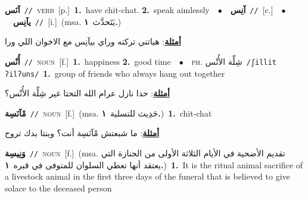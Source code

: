 \documentclass[10pt,a4paper,twoside]{article} %
\begin{document}
\begin{multicols}{2}
{\setlength\topsep{0pt}\textbf{\foreignlanguage{arabic}{آنَس}}\ {\color{gray}\texttt{//}\color{black}}\ \textsc{verb}\ [p.]\ \textbf{1.}~have chit-chat.  \textbf{2.}~speak aimlessly\ \ $\bullet$\ \ \setlength\topsep{0pt}\textbf{\foreignlanguage{arabic}{آنِس}}\ {\color{gray}\texttt{//}\color{black}}\ [c.]\ \ $\bullet$\ \ \setlength\topsep{0pt}\textbf{\foreignlanguage{arabic}{يآنِس}}\ {\color{gray}\texttt{//}\color{black}}\ [i.]\ \color{gray}(msa. \foreignlanguage{arabic}{يَتَحدَّث}~\foreignlanguage{arabic}{\textbf{١.}})\color{black}\  \begin{flushright}\color{gray}\foreignlanguage{arabic}{\textbf{\underline{\foreignlanguage{arabic}{أمثلة}}}: هياتني تركته وراي بيآنِس مع الاخوان اللي ورا}\end{flushright}\color{black}} \vspace{2mm}

{\setlength\topsep{0pt}\textbf{\foreignlanguage{arabic}{أُنْس}}\ {\color{gray}\texttt{//}\color{black}}\ \textsc{noun}\ [f.]\ \textbf{1.}~happiness  \textbf{2.}~good time\ \ $\bullet$\ \ \textsc{ph.} \color{gray} \foreignlanguage{arabic}{شِلِّة الأُنْس}\color{black}\ {\color{gray}\texttt{/{\sffamily ʃillit ʔilʔuns}/}\color{black}}\ \textbf{1.}~group of friends who always hang out together\  \begin{flushright}\color{gray}\foreignlanguage{arabic}{\textbf{\underline{\foreignlanguage{arabic}{أمثلة}}}: حدا نازل عرام الله التحتا غير شِلِّة الأُنْس؟}\end{flushright}\color{black}} \vspace{2mm}

{\setlength\topsep{0pt}\textbf{\foreignlanguage{arabic}{مْآنَسِة}}\ {\color{gray}\texttt{//}\color{black}}\ \textsc{noun}\ [f.]\ \color{gray}(msa. \foreignlanguage{arabic}{حَدِيث للتسلية}~\foreignlanguage{arabic}{\textbf{١.}})\color{black}\ \textbf{1.}~chit-chat\  \begin{flushright}\color{gray}\foreignlanguage{arabic}{\textbf{\underline{\foreignlanguage{arabic}{أمثلة}}}: ما شبعتش مْآنَسِة أنت؟ وينتا بدك تروح}\end{flushright}\color{black}} \vspace{2mm}

{\setlength\topsep{0pt}\textbf{\foreignlanguage{arabic}{وَنِيسِة}}\ {\color{gray}\texttt{//}\color{black}}\ \textsc{noun}\ [f.]\ \color{gray}(msa. \foreignlanguage{arabic}{تقديم الأضحية في الأيام الثلاثة الأولى من الجنازة التي يعتقد أنها تعطي السلوان للمتوفى في قبره}~\foreignlanguage{arabic}{\textbf{١.}})\color{black}\ \textbf{1.}~It is the ritual animal sacrifice of a livestock animal in the first three days of the funeral that is believed to give solace to the deceased person\ } \vspace{2mm}


\end{multicols}
\end{document}
